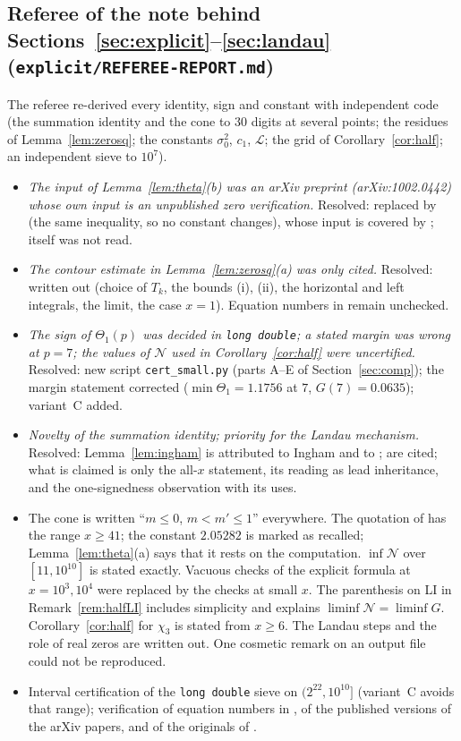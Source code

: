 \documentclass[11pt]{amsart}
\theoremstyle{definition}
\numberwithin{equation}{section}
\newcommand{\cN}{\mathcal N}          %
\newcommand{\cL}{\mathcal L}          %
\begin{document}
\subsection*{Referee of the note behind
Sections~\ref{sec:explicit}--\ref{sec:landau}
(\texttt{explicit/REFEREE-REPORT.md})}
The referee re-derived every identity, sign and constant with
independent code (the summation identity and the cone to $30$ digits
at several points; the residues of Lemma~\ref{lem:zerosq}; the
constants $\sigma_0^2$, $c_1$, $\cL$; the grid of
Corollary~\ref{cor:half}; an independent sieve to $10^7$).
\begin{itemize}
\item[REP-1.] \emph{The input of Lemma~\ref{lem:theta}(b) was an
arXiv preprint (arXiv:1002.0442) whose own input is an unpublished
zero verification.} Resolved: replaced by
\cite[Corollary~11.2]{BKLNW21} (the same inequality, so no constant
changes), whose input is covered by \cite{PT21}; \cite{PT21} itself
was not read.
\item[REP-2.] \emph{The contour estimate in Lemma~\ref{lem:zerosq}(a)
was only cited.} Resolved: written out (choice of $T_k$, the bounds
(i), (ii), the horizontal and left integrals, the limit, the case
$x=1$). Equation numbers in \cite{Dav00} remain unchecked.
\item[REP-3.] \emph{The sign of $\Theta_1(p)$ was decided in
\texttt{long double}; a stated margin was wrong at $p=7$; the values
of $\cN$ used in Corollary~\ref{cor:half} were uncertified.}
Resolved: new script \texttt{cert\_small.py} (parts A--E of
Section~\ref{sec:comp}); the margin statement corrected
($\min\Theta_1=1.1756$ at $7$, $G(7)=0.0635$); variant~C added.
\item[REP-4.] \emph{Novelty of the summation identity; priority for
the Landau mechanism.} Resolved: Lemma~\ref{lem:ingham} is attributed
to Ingham and to \cite[Lemma~2.7]{Joh23}; \cite{HL18,Lan18,Pin91} are
cited; what is claimed is only the all-$x$ statement, its reading as
lead inheritance, and the one-signedness observation with its uses.
\item[Minor.] The cone is written ``$m\le0$, $m<m'\le1$'' everywhere.
The quotation of \cite[Lemma~2.2]{Joh23} has the range $x\ge41$; the
constant $2.05282$ is marked as recalled; Lemma~\ref{lem:theta}(a)
says that it rests on the computation. $\inf\cN$ over
$[11,10^{10}]$ is stated exactly. Vacuous checks of the explicit
formula at $x=10^3,10^4$ were replaced by the checks at small $x$.
The parenthesis on LI in Remark~\ref{rem:halfLI} includes simplicity
and explains $\liminf\cN=\liminf G$. Corollary~\ref{cor:half} for
$\chi_3$ is stated from $x\ge6$. The Landau steps and the role of
real zeros are written out. One cosmetic remark on an output file
could not be reproduced.
\item[Not fixed.] Interval certification of the \texttt{long double}
sieve on $(2^{22},10^{10}]$ (variant~C avoids that range);
verification of equation numbers in \cite{Dav00,MV07,RS62}, of the
published versions of the arXiv papers, and of the originals of
\cite{HL18,Lan18,Pin91}.
\end{itemize}
\end{document}

